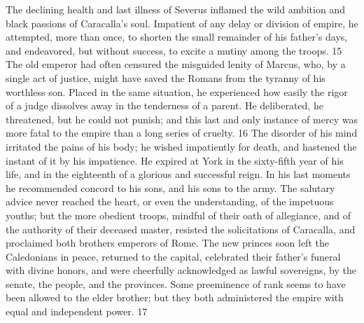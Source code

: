 The declining health and last illness of Severus inflamed the
wild ambition and black passions of Caracalla’s soul. Impatient
of any delay or division of empire, he attempted, more than once,
to shorten the small remainder of his father’s days, and
endeavored, but without success, to excite a mutiny among the
troops. 15 The old emperor had often censured the misguided
lenity of Marcus, who, by a single act of justice, might have
saved the Romans from the tyranny of his worthless son. Placed in
the same situation, he experienced how easily the rigor of a
judge dissolves away in the tenderness of a parent. He
deliberated, he threatened, but he could not punish; and this
last and only instance of mercy was more fatal to the empire than
a long series of cruelty. 16 The disorder of his mind irritated
the pains of his body; he wished impatiently for death, and
hastened the instant of it by his impatience. He expired at York
in the sixty-fifth year of his life, and in the eighteenth of a
glorious and successful reign. In his last moments he recommended
concord to his sons, and his sons to the army. The salutary
advice never reached the heart, or even the understanding, of the
impetuous youths; but the more obedient troops, mindful of their
oath of allegiance, and of the authority of their deceased
master, resisted the solicitations of Caracalla, and proclaimed
both brothers emperors of Rome. The new princes soon left the
Caledonians in peace, returned to the capital, celebrated their
father’s funeral with divine honors, and were cheerfully
acknowledged as lawful sovereigns, by the senate, the people, and
the provinces. Some preeminence of rank seems to have been
allowed to the elder brother; but they both administered the
empire with equal and independent power. 17




